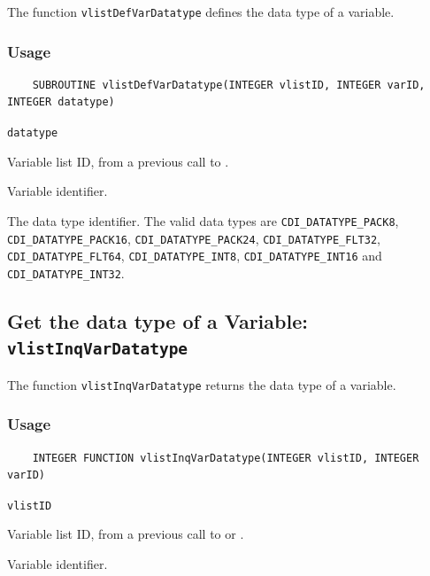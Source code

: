 The function {\texttt{vlistDefVarDatatype}} defines the data type of a variable.

\subsubsection*{Usage}

\begin{verbatim}
    SUBROUTINE vlistDefVarDatatype(INTEGER vlistID, INTEGER varID, INTEGER datatype)
\end{verbatim}

\hspace*{4mm}\begin{minipage}[]{15cm}
\begin{deflist}{\texttt{datatype}\ }
\item[\texttt{vlistID}]
Variable list ID, from a previous call to {}.
\item[\texttt{varID}]
Variable identifier.
\item[\texttt{datatype}]
The data type identifier.
                    The valid {\CDI} data types are {\texttt{CDI\_DATATYPE\_PACK8}}, {\texttt{CDI\_DATATYPE\_PACK16}},
                    {\texttt{CDI\_DATATYPE\_PACK24}}, {\texttt{CDI\_DATATYPE\_FLT32}}, {\texttt{CDI\_DATATYPE\_FLT64}},
                    {\texttt{CDI\_DATATYPE\_INT8}}, {\texttt{CDI\_DATATYPE\_INT16}} and {\texttt{CDI\_DATATYPE\_INT32}}.

\end{deflist}
\end{minipage}


\subsection{Get the data type of a Variable: \texttt{vlistInqVarDatatype}}
\label{vlistInqVarDatatype}

The function {\texttt{vlistInqVarDatatype}} returns the data type of a variable.

\subsubsection*{Usage}

\begin{verbatim}
    INTEGER FUNCTION vlistInqVarDatatype(INTEGER vlistID, INTEGER varID)
\end{verbatim}

\hspace*{4mm}\begin{minipage}[]{15cm}
\begin{deflist}{\texttt{vlistID}\ }
\item[\texttt{vlistID}]
Variable list ID, from a previous call to {} or {}.
\item[\texttt{varID}]
Variable identifier.

\end{deflist}
\end{minipage}


